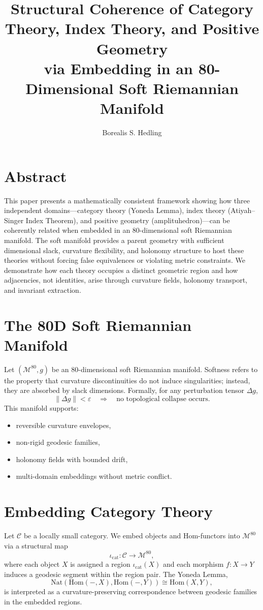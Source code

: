 \documentclass[11pt]{article}
\title{Structural Coherence of Category Theory, Index Theory, and Positive Geometry\\
via Embedding in an 80-Dimensional Soft Riemannian Manifold}
\author{Borealis S. Hedling}
\date{}
\begin{document}
\maketitle

\section*{Abstract}
This paper presents a mathematically consistent framework showing how three
independent domains---category theory (Yoneda Lemma), index theory
(Atiyah--Singer Index Theorem), and positive geometry (amplituhedron)---can be
coherently related when embedded in an 80-dimensional soft Riemannian manifold.
The soft manifold provides a parent geometry with sufficient dimensional slack,
curvature flexibility, and holonomy structure to host these theories without
forcing false equivalences or violating metric constraints. We demonstrate how
each theory occupies a distinct geometric region and how adjacencies, not
identities, arise through curvature fields, holonomy transport, and invariant
extraction.

\section{The 80D Soft Riemannian Manifold}
Let $(\mathcal{M}^{80}, g)$ be an 80-dimensional soft Riemannian manifold.
Softness refers to the property that curvature discontinuities do not induce
singularities; instead, they are absorbed by slack dimensions. Formally, for
any perturbation tensor $\Delta g$,
\[
\|\Delta g\| < \varepsilon \quad \Rightarrow \quad
\text{no topological collapse occurs}.
\]
This manifold supports:
\begin{itemize}
    \item reversible curvature envelopes,
    \item non-rigid geodesic families,
    \item holonomy fields with bounded drift,
    \item multi-domain embeddings without metric conflict.
\end{itemize}

\section{Embedding Category Theory}
Let $\mathcal{C}$ be a locally small category. We embed objects and Hom-functors
into $\mathcal{M}^{80}$ via a structural map
\[
\iota_{\mathrm{cat}} : \mathcal{C} \to \mathcal{M}^{80},
\]
where each object $X$ is assigned a region $\iota_{\mathrm{cat}}(X)$ and each
morphism $f : X \to Y$ induces a geodesic segment within the region pair.
The Yoneda Lemma,
\[
\mathrm{Nat}(\mathrm{Hom}(-,X), \mathrm{Hom}(-,Y))
\cong \mathrm{Hom}(X,Y),
\]
is interpreted as a curvature-preserving correspondence between geodesic
families in the embedded regions.
\end{document}
